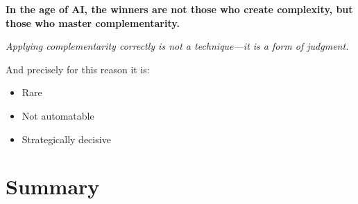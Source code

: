 \begin{tcolorbox}[colback=blue!10!white, colframe=blue!75!black,
    title=Central Conclusion]
\textbf{In the age of AI, the winners are not those who create complexity,
but those who master complementarity.}
\end{tcolorbox}

\begin{tcolorbox}[colback=gray!10!white, colframe=gray!75!black,
    title=Final Statement]
\textit{Applying complementarity correctly is not a technique---it is a form of judgment.}

And precisely for this reason it is:
\begin{itemize}[nosep]
    \item Rare
    \item Not automatable
    \item Strategically decisive
\end{itemize}
\end{tcolorbox}


\section{Summary}
\label{sec:thermo-summary}

